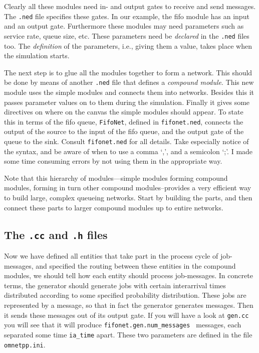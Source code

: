 \documentclass[a4paper]{article}
\begin{document}
Clearly all these modules need in- and output gates to receive and
send messages. The \texttt{.ned} file specifies these gates. In our
example, the fifo module has an input and an output gate. Furthermore
these modules may need parameters such as service rate, queue size,
etc. These parameters need be \emph{declared}  in the \texttt{.ned} files
too. The \emph{definition} of the parameters, i.e., giving them a
value, takes place when the simulation starts.

The next step is to glue all the modules together to form a network.
This should be done by means of another \texttt{.ned} file that
defines a \emph{compound module}. This new module uses the simple
modules and connects them into networks. Besides this it passes
parameter values on to them during the simulation. Finally it gives
some directives on where on the canvas the simple modules should
appear. To state this in terms of the fifo queue, \texttt{FifoNet},
defined in \texttt{fifonet.ned}, connects the output of the source to
the input of the fifo queue, and the output gate of the queue to the
sink. Consult \texttt{fifonet.ned} for all details. Take especially
notice of the syntax, and be aware of when to use a comma `,', and a
semicolon `;'. I made some time consuming errors by not using them in
the appropriate way.

Note that this hierarchy of
modules---simple modules forming compound modules, forming in turn
other compound modules--provides a very efficient way to build large,
complex queueing networks. Start by building the parts, and then
connect these parts to larger compound modules up to entire networks.

\subsection{The \texttt{.cc} and \texttt{.h} files}
\label{sec:texttt.cc-texttt.h-f}
Now we have defined all entities that take part in the process cycle
of job-messages, and specified the routing between these entities in
the compound modules, we should tell how each entity should process
job-messages. In concrete terms, the generator should generate jobs
with certain interarrival times distributed according to some
specified probability distribution. These jobs are represented by a
message, so that in fact the generator generates messages. Then it
sends these messages out of its output gate. If you will have a look
at \texttt{gen.cc} you will see that it will produce
\texttt{fifonet.gen.num\_messages } messages, each separated some time
\texttt{ia\_time} apart. These two parameters are defined in the file
\texttt{omnetpp.ini}.
\end{document}
